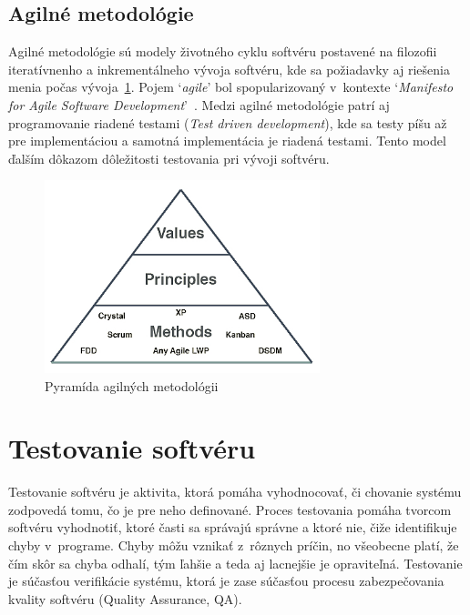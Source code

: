 \section{Agilné metodológie}
\label{agile}
Agilné metodológie sú modely životného cyklu softvéru postavené na filozofii iteratívnenho a inkrementálneho vývoja softvéru, kde sa požiadavky aj riešenia menia počas vývoja~\ref{agile_pyramide}.
Pojem `\textit{agile}' bol spopularizovaný v~kontexte `\textit{Manifesto for Agile Software Development}'~\cite{agile_manifesto}.
Medzi agilné metodológie patrí aj programovanie riadené testami (\textit{Test driven development}), kde sa testy píšu až pre implementáciou a samotná implementácia je riadená testami. Tento model ďalším dôkazom dôležitosti testovania pri vývoji softvéru.

\begin{figure}[h]
\centering
\includegraphics[width=8cm,keepaspectratio=true]{obrazky/agile_pyramide.png}
\caption{Pyramída agilných metodológii~\cite{models}}
\label{agile_pyramide}
\end{figure}

\chapter{Testovanie softvéru}
\label{testing}
Testovanie softvéru je aktivita, ktorá pomáha vyhodnocovať, či chovanie systému zodpovedá tomu, čo je pre neho definované.
Proces testovania pomáha tvorcom softvéru vyhodnotiť, ktoré časti sa správajú správne a ktoré nie, čiže identifikuje chyby v~programe.
Chyby môžu vznikať z~rôznych príčin, no všeobecne platí, že čím skôr sa chyba odhalí, tým ľahšie a teda aj lacnejšie je opraviteľná.
Testovanie je súčasťou verifikácie systému, ktorá je zase súčasťou procesu zabezpečovania kvality softvéru (Quality Assurance, QA).~\cite{hornicky}

